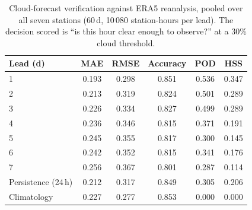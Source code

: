\begin{table}[t]
\caption{Cloud-forecast verification against ERA5 reanalysis, pooled over all seven stations (60\,d, 10\,080 station-hours per lead). The decision scored is ``is this hour clear enough to observe?'' at a 30\% cloud threshold.}
\label{tab:forecast}
\centering
\setlength{\tabcolsep}{4.2pt}
\begin{tabular}{lccccc}
\toprule
Lead (d) & MAE & RMSE & Accuracy & POD & HSS \\
\midrule
1 & 0.193 & 0.298 & 0.851 & 0.536 & 0.347 \\
2 & 0.213 & 0.319 & 0.824 & 0.501 & 0.289 \\
3 & 0.226 & 0.334 & 0.827 & 0.499 & 0.289 \\
4 & 0.236 & 0.346 & 0.815 & 0.371 & 0.191 \\
5 & 0.245 & 0.355 & 0.817 & 0.300 & 0.145 \\
6 & 0.242 & 0.352 & 0.815 & 0.341 & 0.176 \\
7 & 0.256 & 0.367 & 0.801 & 0.287 & 0.114 \\
\midrule
Persistence (24\,h) & 0.212 & 0.317 & 0.849 & 0.305 & 0.206 \\
Climatology & 0.227 & 0.277 & 0.853 & 0.000 & 0.000 \\
\bottomrule
\end{tabular}
\end{table}
